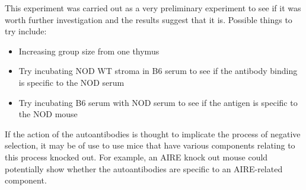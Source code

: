 This experiment was carried out as a very preliminary experiment to see if it was worth further investigation and the results suggest that it is.
Possible things to try include:
\begin{itemize}
\item Increasing group size from one thymus
\item Try incubating NOD WT stroma in B6 serum to see if the antibody binding is specific to the NOD serum
\item Try incubating B6 serum with NOD serum to see if the antigen is specific to the NOD mouse
\end{itemize}

If the action of the autoantibodies is thought to implicate the process of negative selection, it may be of use to use mice that have various components relating to this process knocked out.
For example, an AIRE knock out mouse could potentially show whether the autoantibodies are specific to an AIRE-related component.


